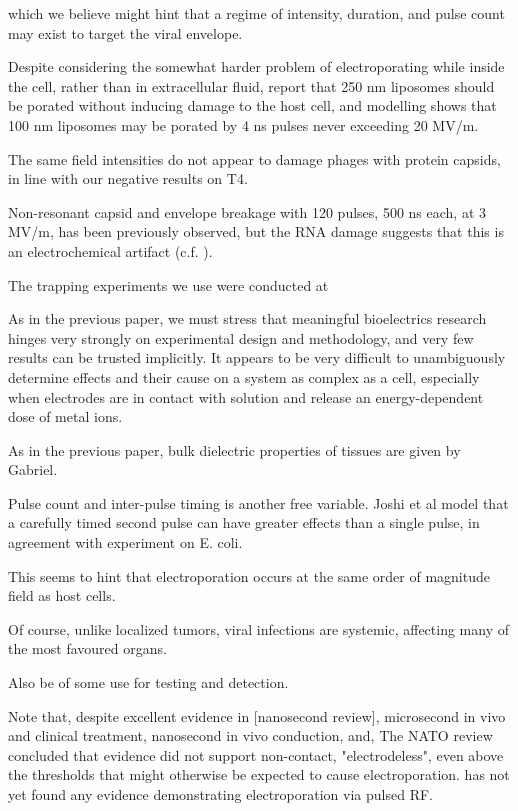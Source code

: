 \documentclass[fleqn,10pt]{paper}
\begin{document}
 which we believe might hint that a regime of intensity, duration, and pulse count may exist to target the viral envelope. 
 
Despite considering the somewhat harder problem of electroporating while inside the cell, rather than in extracellular fluid, \cite{Electroporation2013} report that 250 nm liposomes should be porated without inducing damage to the host cell, and modelling shows that 100 nm liposomes may be porated by 4 ns pulses never exceeding 20 MV/m. 

The same field intensities do not appear to damage phages with protein capsids\cite{Manipulation2013}, in line with our negative results on T4.

Non-resonant capsid and envelope breakage with 120 pulses, 500 ns each, at 3 MV/m, has been previously observed\cite{Inactivation1990}, but the RNA damage suggests that this is an electrochemical artifact \cite{Formation1996} (c.f. \cite{Microwave1987}). 

The trapping experiments we use were conducted at 

As in the previous paper, we must stress that meaningful bioelectrics research hinges very strongly on experimental design and methodology, and very few results can be trusted implicitly. It appears to be very difficult to unambiguously determine effects and their cause on a system as complex as a cell, especially when electrodes are in contact with solution and release an energy-dependent dose of metal ions.




As in the previous paper, bulk dielectric properties of tissues are given by Gabriel. 


Pulse count and inter-pulse timing is another free variable. Joshi et al \cite{Selfconsistent2001} model that a carefully timed second pulse can have greater effects than a single pulse, in agreement with experiment on E. coli.

This seems to hint that electroporation occurs at the same order of magnitude field as host cells.

Of course, unlike localized tumors, viral infections are systemic, affecting many of the most favoured organs. 

Also be of some use for testing and detection. 



Note that, despite excellent evidence in [nanosecond review], microsecond in vivo and clinical treatment, nanosecond in vivo conduction, and, The NATO review concluded that evidence did not support non-contact, "electrodeless", even above the thresholds that might otherwise be expected to cause electroporation. has not yet found any evidence demonstrating electroporation via pulsed RF. 
\end{document}
